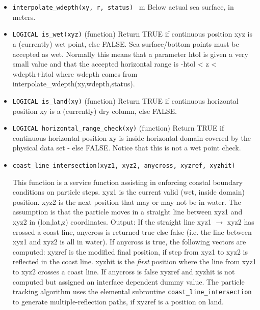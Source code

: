 \begin{itemize}

 \item {\tt interpolate\_wdepth(xy, r, status) } m \newline  Below actual sea surface, in meters.    
 
 \item {\tt LOGICAL is\_wet(xyz)} (function) Return TRUE if continuous position 
         xyz is a (currently) wet point,  else FALSE.
         Sea surface/bottom points must be accepted as wet. 
         Normally this means that a parameter htol is given a very small value and that
         the accepted horizontal range is  -htol < z < wdepth+htol
         where wdepth comes from interpolate\_wdepth(xy,wdepth,status).

 \item {\tt LOGICAL is\_land(xy)} (function) Return TRUE if continuous horizontal 
         position xy is a (currently) dry column, else FALSE.

 \item {\tt LOGICAL horizontal\_range\_check(xy)} (function) Return TRUE if continuous horizontal 
        position xy is inside horizontal domain covered by the physical data set - else FALSE.
        Notice that this is not a wet point check.

 
 \item {\tt coast\_line\_intersection(xyz1, xyz2, anycross, xyzref, xyzhit)} 
 
   This function is a service function assisting in enforcing 
   coastal boundary conditions on particle steps. xyz1 is the current 
   valid (wet, inside domain) position. xyz2 is the next position that may or may not be in water.
   The assumption is that the particle moves in a straight line 
   between xyz1 and xyz2 in (lon,lat,z) coordinates.\newline
   Output: If the straight line xyz1 $\rightarrow$ xyz2 has crossed a coast line, 
   anycross is returned true else false (i.e. the line between xyz1 and xyz2 is all in water). 
   If anycross is true, the following vectors are computed:
   xyzref is the modified final position, if step from xyz1 to xyz2 is reflected
   in the coast line. xyzhit is the {\em first} position where the line from xyz1 to xyz2 
   crosses a coast line. 
   If anycross is false xyzref and xyzhit is not computed but assigned an interface
   dependent dummy value. The particle tracking algorithm uses the elemental 
   subroutine {\tt coast\_line\_intersection}
   to generate multiple-reflection paths, if xyzref is a position on land.

\end{itemize}

